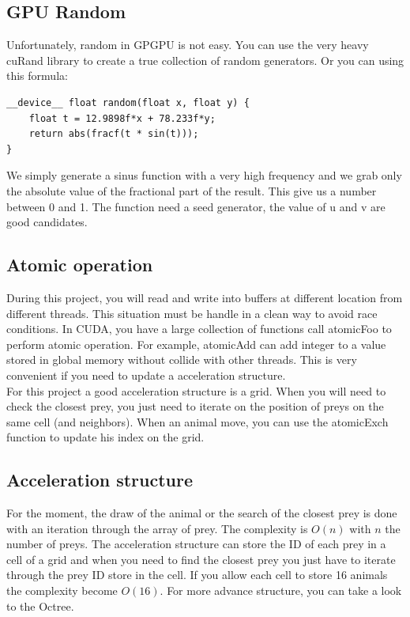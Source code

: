 \documentclass{article}
\begin{document}
\subsection{GPU Random}
Unfortunately, random in GPGPU is not easy. You can use the very heavy cuRand library to create a true collection of random generators. Or you can using this formula:
\begin{lstlisting}
__device__ float random(float x, float y) {
	float t = 12.9898f*x + 78.233f*y;
	return abs(fracf(t * sin(t)));
}
\end{lstlisting}
We simply generate a sinus function with a very high frequency and we grab only the absolute value of the fractional part of the result. This give us a number between 0 and 1. The function need a seed generator, the value of u and v are good candidates.

\subsection{Atomic operation}
During this project, you will read and write into buffers at different location from different threads. This situation must be handle in a clean way to avoid race conditions. In CUDA, you have a large collection of functions call atomicFoo to perform atomic operation. For example, atomicAdd can add integer to a value stored in global memory without collide with other threads. This is very convenient if you need to update a acceleration structure.\\
For this project a good acceleration structure is a grid. When you will need to check the closest prey, you just need to iterate on the position of preys on the same cell (and neighbors). When an animal move, you can use the atomicExch function to update his index on the grid.

\subsection{Acceleration structure}
For the moment, the draw of the animal or the search of the closest prey is done with an iteration through the array of prey. The complexity is $O(n)$ with $n$ the number of preys. The acceleration structure can store the ID of each prey in a cell of a grid and when you need to find the closest prey you just have to iterate through the prey ID store in the cell. If you allow each cell to store 16 animals the complexity become $O(16)$. For more advance structure, you can take a look to the Octree.
\end{document}
